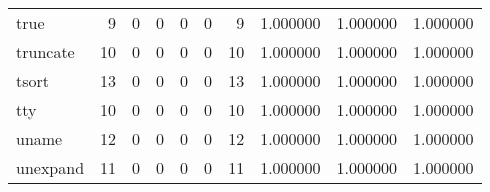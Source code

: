 \begin{longtable}{lrrrrrrrrr}
true      &                                       9 &                                                  0 &                                                  0 &                                                  0 &                                                  0 &                                                  9 &                                           1.000000 &                               1.000000 &                             1.000000 \\
truncate  &                                      10 &                                                  0 &                                                  0 &                                                  0 &                                                  0 &                                                 10 &                                           1.000000 &                               1.000000 &                             1.000000 \\
tsort     &                                      13 &                                                  0 &                                                  0 &                                                  0 &                                                  0 &                                                 13 &                                           1.000000 &                               1.000000 &                             1.000000 \\
tty       &                                      10 &                                                  0 &                                                  0 &                                                  0 &                                                  0 &                                                 10 &                                           1.000000 &                               1.000000 &                             1.000000 \\
uname     &                                      12 &                                                  0 &                                                  0 &                                                  0 &                                                  0 &                                                 12 &                                           1.000000 &                               1.000000 &                             1.000000 \\
unexpand  &                                      11 &                                                  0 &                                                  0 &                                                  0 &                                                  0 &                                                 11 &                                           1.000000 &                               1.000000 &                             1.000000 \\

\end{longtable}
